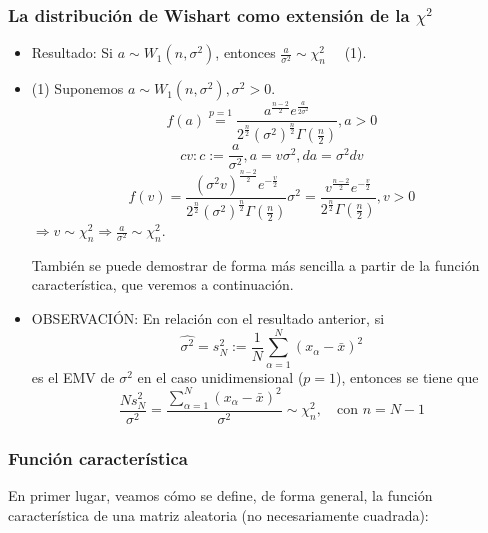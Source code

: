 \documentclass[11pt,a4paper]{article}
\begin{document}
\subsubsection{La distribución de Wishart como extensión de la \texorpdfstring{$\chi^{2}$})}
\begin{itemize}
\item Resultado: Si $a \sim W_{1}(n, \sigma^{2})$, entonces $\frac{a}{\sigma^{2}} \sim \chi_{n}^{2} \quad$ (1).

\item (1) Suponemos $a \sim W_{1}(n, \sigma^{2}), \sigma^{2} > 0$.
$$f(a) \overset{p=1}{=} \frac{a^{\frac{n-2}{2}}e^{\frac{a}{2\sigma^{2}}}}{2^{\frac{n}{2}}(\sigma^{2})^{\frac{n}{2}}\Gamma(\frac{n}{2})}, a > 0$$
$$cv : c := \frac{a}{\sigma^{2}}, a = v\sigma^{2}, da = \sigma^{2}dv$$
$$f(v) = \frac{(\sigma^{2}v)^{\frac{n-2}{2}} e^{-\frac{v}{2}}}{2^{\frac{n}{2}}(\sigma^{2})^{\frac{n}{2}}\Gamma(\frac{n}{2})}\sigma^{2} = \frac{v^{\frac{n-2}{2}}e^{-\frac{v}{2}}}{2^{\frac{n}{2}}\Gamma(\frac{n}{2})}, v > 0$$
$\Rightarrow v \sim \chi_{n}^{2} \Rightarrow \frac{a}{\sigma^{2}} \sim \chi_{n}^{2}$.

También se puede demostrar de forma más sencilla a partir de la función característica, que veremos a continuación.

\item OBSERVACIÓN: En relación con el resultado anterior, si
$$\hat{\sigma^{2}} = s_{N}^{2} := \frac{1}{N} \sum_{\alpha=1}^{N}(x_{\alpha} - \bar{x})^{2}$$
es el EMV de $\sigma^{2}$ en el caso unidimensional ($p=1$), entonces se tiene que
$$\frac{Ns_{N}^{2}}{\sigma^{2}} = \frac{\sum_{\alpha=1}^{N}(x_{\alpha} - \bar{x})^{2}}{\sigma^{2}} \sim \chi_{n}^{2}, \quad \text{con } n=N-1$$
\end{itemize}

\subsubsection{Función característica}
En primer lugar, veamos cómo se define, de forma general, la función característica de una matriz aleatoria (no necesariamente cuadrada):
\end{document}

